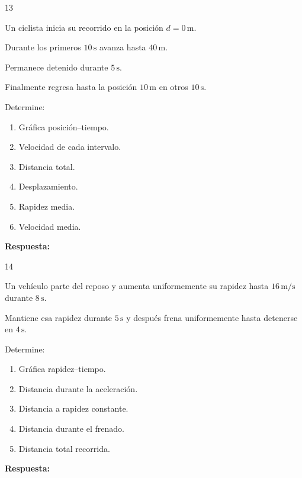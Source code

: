 \documentclass[11pt,letterpaper]{article}
\newcommand{\respuesta}{
 \par\vspace{0.3cm}
 \textcolor{morado}{\textbf{Respuesta:}}
 \hrulefill
 \par\vspace{0.3cm}
}
\newcommand{\espacio}[1]{
 \par\vspace{#1}
}
\begin{document}
\begin{ejercicio}{13}

Un ciclista inicia su recorrido
en la posición $d=0\,\mathrm{m}$.

Durante los primeros $10\,\mathrm{s}$
avanza hasta $40\,\mathrm{m}$.

Permanece detenido durante
$5\,\mathrm{s}$.

Finalmente regresa hasta
la posición $10\,\mathrm{m}$
en otros $10\,\mathrm{s}$.

Determine:

\begin{enumerate}[label=\alph*)]
\item Gráfica posición--tiempo.
\item Velocidad de cada intervalo.
\item Distancia total.
\item Desplazamiento.
\item Rapidez media.
\item Velocidad media.
\end{enumerate}

\espacio{5cm}
\respuesta

\end{ejercicio}
\newpage
\begin{ejercicio}{14}

Un vehículo parte del reposo
y aumenta uniformemente su rapidez
hasta $16\,\mathrm{m/s}$
durante $8\,\mathrm{s}$.

Mantiene esa rapidez durante
$5\,\mathrm{s}$ y después
frena uniformemente hasta detenerse
en $4\,\mathrm{s}$.

Determine:

\begin{enumerate}[label=\alph*)]
\item Gráfica rapidez--tiempo.
\item Distancia durante la aceleración.
\item Distancia a rapidez constante.
\item Distancia durante el frenado.
\item Distancia total recorrida.
\end{enumerate}

\espacio{5cm}
\respuesta

\end{ejercicio}

\newpage
\end{document}
